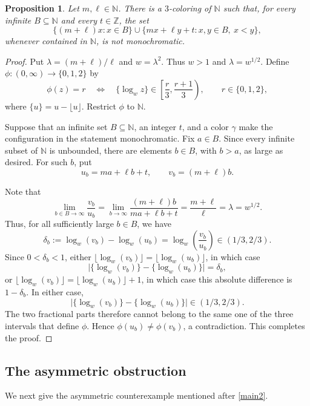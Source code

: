 \documentclass[reqno,12pt]{amsart}
\newtheorem{prop}[thm]{Proposition}
\def \N {\mathbb N}
\def \Z {\mathbb Z}
\numberwithin{equation}{section}
\begin{document}
\begin{prop}\label{prop6-1}
Let $m,\ell\in\N$. There is a $3$-coloring of $\N$ such that, for every infinite $B\subseteq\N$ and every $t\in\Z$, the set
\[
 \{(m+\ell)x:x\in B\}
 \cup
 \{mx+\ell y+t:x,y\in B,\ x<y\},
\]
whenever contained in $\N$, is not monochromatic.
\end{prop}

\begin{proof}
Put $\lambda=(m+\ell)/\ell$ and $w=\lambda^2$. Thus $w>1$ and $\lambda=w^{1/2}$. Define $\phi:(0,\infty)\to\{0,1,2\}$ by
\[
 \phi(z)=r
 \quad\Longleftrightarrow\quad
 \{\log_w z\}\in\left[\frac r3,\frac{r+1}{3}\right),
 \qquad r\in\{0,1,2\},
\]
where $\{u\}=u-\lfloor u\rfloor$. Restrict $\phi$ to $\N$.

Suppose that an infinite set $B\subseteq\N$, an integer $t$, and a color $\gamma$ make the configuration in the statement monochromatic. Fix $a\in B$. Since every infinite subset of $\N$ is unbounded, there are elements $b\in B$, with $b>a$, as large as desired. For such $b$, put
\[
 u_b=ma+\ell b+t,
 \qquad
 v_b=(m+\ell)b.
\]

Note that
\[
\lim_{b\in B\to\infty}\frac{v_b}{u_b}
=\lim_{b\to\infty}\frac{(m+\ell)b}{ma+\ell b+t}
=\frac{m+\ell}{\ell}
=\lambda=w^{1/2}.
\]
Thus, for all sufficiently large $b\in B$, we have
\[
 \delta_b:=\log_w(v_b)-\log_w(u_b)
 =\log_w\left(\frac{v_b}{u_b}\right)\in(1/3,2/3).
\]
Since $0<\delta_b<1$, either
$\lfloor\log_w(v_b)\rfloor=\lfloor\log_w(u_b)\rfloor$, in which case
\[
 \bigl|\{\log_w(v_b)\}-\{\log_w(u_b)\}\bigr|=\delta_b,
\]
or $\lfloor\log_w(v_b)\rfloor=\lfloor\log_w(u_b)\rfloor+1$, in which
case this absolute difference is $1-\delta_b$. In either case,
\[
 \bigl|\{\log_w(v_b)\}-\{\log_w(u_b)\}\bigr|\in(1/3,2/3).
\]
The two fractional parts therefore cannot belong to the same one of
the three intervals that define $\phi$. Hence
$\phi(u_b)\neq\phi(v_b)$, a contradiction. This completes the proof.
\end{proof}


\subsection{The asymmetric obstruction}\label{sec7-2}
We next give the asymmetric counterexample mentioned after
\cref{main2}.
\end{document}
